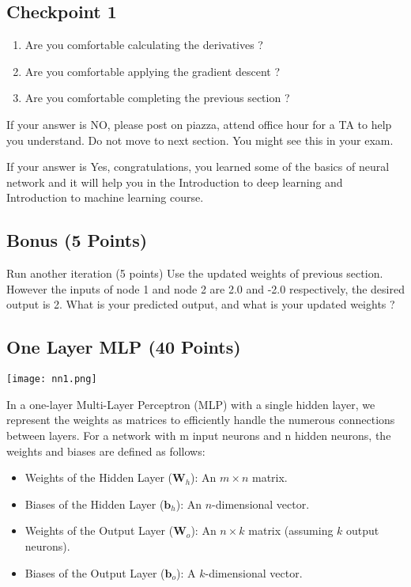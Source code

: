 \subsection{Checkpoint 1}
\begin{enumerate}
    \item  Are you comfortable calculating the derivatives ?
\item Are you comfortable applying the gradient descent ?
\item Are you comfortable completing the previous section ?
\end{enumerate}

If your answer is NO, please post on piazza, attend office hour for a TA to help you understand.
Do not move to next section. You might see this in your exam.


If your answer is Yes, congratulations, you learned some of the basics of neural network and it will help you
in the Introduction to deep learning and Introduction to machine learning course.

\subsection{Bonus (5 Points)}
Run another iteration (5 points) Use the updated weights of previous section. However the inputs of
node 1 and node 2 are 2.0 and -2.0 respectively, the desired output is 2. What is your predicted output, and
what is your updated weights ?

\subsection{One Layer MLP (40 Points)}

\begin{center}
    \texttt{[image: nn1.png]}
\end{center}
In a one-layer Multi-Layer Perceptron (MLP) with a single hidden layer, we represent the weights as matrices
to efficiently handle the numerous connections between layers. For a network with m input neurons and n
hidden neurons, the weights and biases are defined as follows:
\begin{itemize}
    \item Weights of the Hidden Layer ($\mathbf{W}_h$): An $m \times n$ matrix.
    \item Biases of the Hidden Layer ($\mathbf{b}_h$): An $n$-dimensional vector.
    \item Weights of the Output Layer ($\mathbf{W}_o$): An $n \times k$ matrix (assuming $k$ output neurons).
    \item Biases of the Output Layer ($\mathbf{b}_o$): A $k$-dimensional vector.
\end{itemize}

